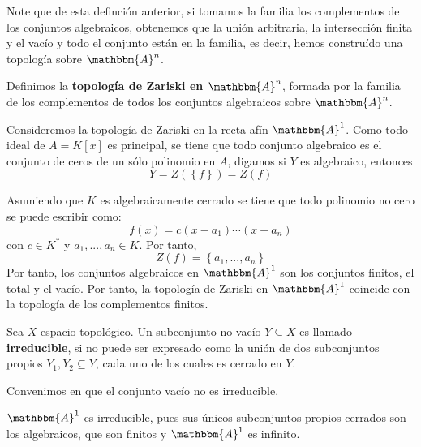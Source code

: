\documentclass[12pt]{report}
\theoremstyle{largebreak}
\newcommand{\bbm}[1]{\ensuremath{\mathbbm{#1}}}
\begin{document}
    Note que de esta definción anterior, si tomamos la familia los complementos de los conjuntos algebraicos, obtenemos que la unión arbitraria, la intersección finita y el vacío y todo el conjunto están en la familia, es decir, hemos construído una topología sobre $\bbm{A}^n$.

    \begin{mydef}
        Definimos la \textbf{topología de Zariski en $\bbm{A}^n$}, formada por la familia de los complementos de todos los conjuntos algebraicos sobre $\bbm{A}^n$.
    \end{mydef}

    \begin{exa}
        Consideremos la topología de Zariski en la recta afín $\bbm{A}^1$. Como todo ideal de $A=K[x]$ es principal, se tiene que todo conjunto algebraico es el conjunto de ceros de un sólo polinomio en $A$, digamos si $Y$ es algebraico, entonces
        \begin{equation*}
            Y=Z(\left\{f\right\})=Z(f)
        \end{equation*}

        Asumiendo que $K$ es algebraicamente cerrado se tiene que todo polinomio no cero se puede escribir como:
        \begin{equation*}
            f(x)=c(x-a_1)\cdots(x-a_n)
        \end{equation*}
        con $c\in K^*$ y $a_1,...,a_n\in K$. Por tanto,
        \begin{equation*}
            Z(f)=\left\{a_1,...,a_n\right\}
        \end{equation*}
        Por tanto, los conjuntos algebraicos en $\bbm{A}^1$ son los conjuntos finitos, el total y el vacío. Por tanto, la topología de Zariski en $\bbm{A}^1$ coincide con la topología de los complementos finitos.
    \end{exa}

    \begin{mydef}
        Sea $X$ espacio topológico. Un subconjunto no vacío $Y\subseteq X$ es llamado \textbf{irreducible}, si no puede ser expresado como la unión de dos subconjuntos propios $Y_1,Y_2\subseteq Y$, cada uno de los cuales es cerrado en $Y$.

        Convenimos en que el conjunto vacío no es irreducible.
    \end{mydef}

    \begin{exa}
        $\bbm{A}^1$ es irreducible, pues sus únicos subconjuntos propios cerrados son los algebraicos, que son finitos y $\bbm{A}^1$ es infinito.
    \end{exa}
\end{document}
